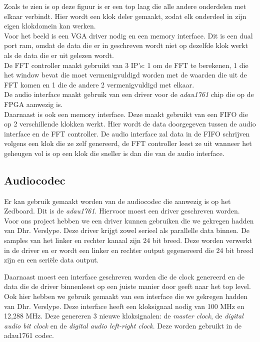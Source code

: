 \documentclass[a4paper,kul]{kulakarticle} %
\begin{document}
Zoals te zien is op deze figuur is er een top laag die alle andere onderdelen met elkaar verbindt. Hier wordt een klok deler gemaakt, zodat elk onderdeel in zijn eigen klokdomein kan werken. \\

Voor het beeld is een VGA driver nodig en een memory interface. Dit is een dual port ram, omdat de data die er in geschreven wordt niet op dezelfde klok werkt als de data die er uit gelezen wordt. \\

De FFT controller maakt gebruikt van 3 IP's: 1 om de FFT te berekenen, 1 die het window bevat die moet vermenigvuldigd worden met de waarden die uit de FFT komen en 1 die de andere 2 vermenigvuldigd met elkaar. \\

De audio interface maakt gebruik van een driver voor de \textit{adau1761} chip die op de FPGA aanwezig is.\\

Daarnaast is ook een memory interface. Deze maakt gebruikt van een FIFO die op 2 verschillende klokken werkt. Hier wordt de data doorgegeven tussen de audio interface en de FFT controller. De audio interface zal data in de FIFO schrijven volgens een klok die ze zelf genereerd, de FFT controller leest ze uit wanneer het geheugen vol is op een klok die sneller is dan die van de audio interface.

\subsection{Audiocodec}

Er kan gebruik gemaakt worden van de audiocodec die aanwezig is op het Zedboard. Dit is de \textit{adau1761}. Hiervoor moest een driver geschreven worden. Voor ons project hebben we een driver kunnen gebruiken die we gekregen hadden van Dhr. Verslype. Deze driver krijgt zowel serieel als parallelle data binnen. De samples van het linker en rechter kanaal zijn 24 bit breed. Deze worden verwerkt in de driver en er wordt een linker en rechter output gegenereerd die 24 bit breed zijn en een seriële data output. \newline

Daarnaast moest een interface geschreven worden die de clock genereerd en de data die de driver binnenleest op een juiste manier door geeft naar het top level. Ook hier hebben we gebruik gemaakt van een interface die we gekregen hadden van Dhr. Verslype. Deze interface heeft een kloksignaal nodig van 100 MHz en 12,288 MHz. Deze genereren 3 nieuwe kloksignalen: de \textit{master clock}, de \textit{digital audio bit clock} en de \textit{digital audio left-right clock}. Deze worden gebruikt in de adau1761 codec. \newline
\end{document}
